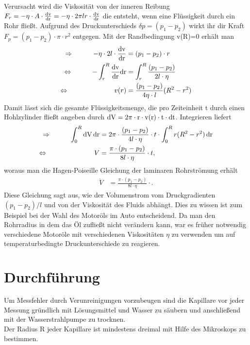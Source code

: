 \documentclass[12pt, a4paper, twoside]{scrartcl}
\begin{document}
Verursacht wird die Viskosität von der inneren Reibung $F_r=-\eta\cdot A\cdot\frac{\rm dv}{\rm dr}=-\eta\cdot 2\pi l r\cdot\frac{\rm dv}{\rm dr}$ die entsteht, wenn eine Flüssigkeit durch ein Rohr fließt. Aufgrund des Druckunterschieds $\delta p=(p_1-p_2)$ wirkt ihr dir Kraft $F_p=(p_1-p_2)\cdot\pi\cdot r^2$ entgegen. Mit der Randbedingung v(R)=0 erhält man
\begin{align*}
\Rightarrow\hspace{1cm}-\eta\cdot2 l\cdot\frac{\rm dv}{\rm dr}&=(p_1-p_2)\cdot r \\
\Leftrightarrow\hspace{1.0cm}-\int_r^R\frac{\rm dv}{\rm dr}\rm dr&=\int_r^R\frac{(p_1-p_2)}{2l\cdot\eta} \\
\Leftrightarrow\hspace{2.35cm}v(r)&=\frac{(p_1-p_2)}{4\eta\cdot l}(R^2-r^2)
\end{align*}
Damit lässt sich die gesamte Flüssigkeitsmenge, die pro Zeiteinheit t durch einen Hohlzylinder fließt angeben durch $\rm dV=2\pi\cdot r\cdot v(r)\cdot t\cdot dt$. Integrieren liefert
\begin{align*}
\Rightarrow \hspace*{1cm}\int_0^R\rm dV\,\rm dr&=2\pi\cdot\frac{(p_1-p_2)}{4l\cdot\eta}\cdot t\cdot\int_0^Rr(R^2-r^2)\,\rm dr \\
\Leftrightarrow \hspace*{2.4cm}V&=\frac{\pi\cdot(p_1-p_2)}{8l\cdot\eta}\cdot t\rm,
\end{align*}
woraus man die Hagen-Poiseille Gleichung der laminaren Rohrströmung erhält
\begin{align*}
\dot V&=\frac{\pi\cdot(p_1-p_2)}{8l\cdot\eta}\cdot.
\end{align*}
Diese Gleichung sagt aus, wie der Volumenstrom vom Druckgradienten $(p_1-p_2)/l$ und von der Viskosität des Fluids abhängt. Dies zu wissen ist zum Beispiel bei der Wahl des Motoröls im Auto entscheidend. Da man den Rohrradius in dem das Öl zufließt nicht verändern kann, war es früher notwendig verschiedene Motoröle mit verschiedenen Viskositäten $\eta$ zu verwenden um auf temperaturbedingte Druckunterschiede zu reagieren.

\section{Durchführung}
\label{sec:durchfuehrung}

Um Messfehler durch Verunreinigungen vorzubeugen sind die Kapillare vor jeder Messung gründlich mit 
Lösungsmittel und Wasser zu säubern und anschließend mit der Wasserstrahlpumpe zu trocknen. \\
Der Radius R jeder Kapillare ist mindestens dreimal mit Hilfe des Mikroskops zu bestimmen.\\
\end{document}
